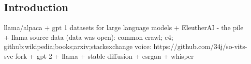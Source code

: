 
\subsection{Introduction}

llama/alpaca
+ gpt 1
datasets for large language models
+ EleutherAI - the pile
+ llama source data (data was open): common crawl; c4; github;wikipedia;books;arxiv;stackexchange
voice: https://github.com/34j/so-vits-svc-fork
+ gpt 2
+ llama
+ stable diffusion
+ esrgan
+ whisper

